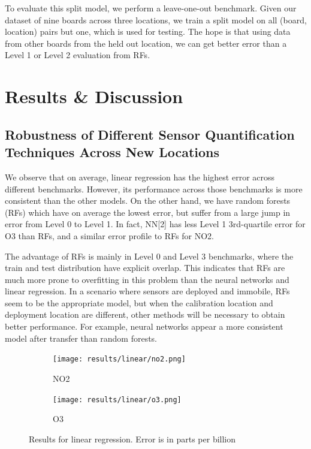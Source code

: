 \documentclass[journal abbreviation, manuscript]{copernicus}
\begin{document}
To evaluate this split model, we perform a leave-one-out benchmark. Given our dataset of nine boards across three locations, we train a split model on all (board, location) pairs but one, which is used for testing. The hope is that using data from other boards from the held out location, we can get better error than a Level 1 or Level 2 evaluation from RFs.


\section{Results \& Discussion}

\subsection{Robustness of Different Sensor Quantification Techniques Across New Locations}

We observe that on average, linear regression has the highest error across different benchmarks. However, its performance across those benchmarks is more consistent than the other models. On the other hand, we have random forests (RFs) which have on average the lowest error, but suffer from a large jump in error from Level 0 to Level 1. In fact, NN[2] has less Level 1 3rd-quartile error for O3 than RFs, and a similar error profile to RFs for NO2.

The advantage of RFs is mainly in Level 0 and Level 3 benchmarks, where the train and test distribution have explicit overlap. This indicates that RFs are much  more prone to overfitting in this problem than the neural networks and linear regression. In a scenario where sensors are deployed and immobile, RFs seem to be the appropriate model, but when the calibration location and deployment location are different, other methods will be necessary to obtain better performance. For example, neural networks appear a more consistent model after transfer than random forests.

\begin{figure}[H]
\centering
\begin{subfigure}{0.45\textwidth}
\texttt{[image: results/linear/no2.png]}
\caption{NO2}
\end{subfigure}
\begin{subfigure}{0.45\textwidth}
\texttt{[image: results/linear/o3.png]}
\caption{O3}
\end{subfigure}
\caption{Results for linear regression. Error is in parts per billion}
\label{fig:results-linear}
\end{figure}
\end{document}
